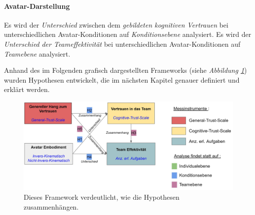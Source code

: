 \documentclass[a4paper,11pt]{article}%
\renewcommand{\\}{\vspace*{0.5\baselineskip} \newline}
\begin{document}
\paragraph{Avatar-Darstellung}
Es wird der \textit{Unterschied} zwischen dem \textit{gebildeten kognitiven Vertrauen} bei unterschiedlichen Avatar-Konditionen auf \textit{Konditionsebene} analysiert.
Es wird der \textit{Unterschied} \textit{der Teameffektivität} bei unterschiedlichen Avatar-Konditionen auf \textit{Teamebene} analysiert.

Anhand des im Folgenden grafisch dargestellten Frameworks (siehe \textit{Abbildung \ref{Versuchshypothesen}}) wurden Hypothesen entwickelt, die im nächsten Kapitel genauer definiert und erklärt werden.

\begin{figure}[H]
		\begin{footnotesize}
			\includegraphics[width=\textwidth]{Abbildungen/Versuchshypothesen_02.JPG}		
			\caption[Das Framework der Versuchshypothesen]{Dieses Framework verdeutlicht, wie die Hypothesen zusammenhängen.}
			\label{Versuchshypothesen}
		\end{footnotesize}
	\end{figure}	

\newpage


\end{document}
